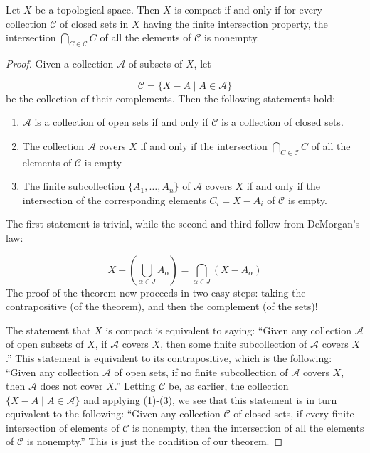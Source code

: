 \begin{theorem}
\label{thm:\thetheorem}
 Let \(X\) be a topological space. Then \(X\) is compact if and only if for every collection \(\mathcal{C}\) of closed sets in \(X\) having the finite intersection property, the intersection \(\mathop{\bigcap }\limits_{{C \in \mathcal{C}}}C\) of all the elements of \(\mathcal{C}\) is nonempty.
\end{theorem}
\begin{proof}
 Given a collection \(\mathcal{A}\) of subsets of \(X\), let

\[
\mathcal{C} = \{ X - A \mid A \in \mathcal{A}\}
\]
be the collection of their complements. Then the following statements hold:

\begin{enumerate}[itemsep=0.2em, parsep=0pt, topsep=0pt, partopsep=0pt, leftmargin=*, label=(\arabic*), align=left]
\item \(\mathcal{A}\) is a collection of open sets if and only if \(\mathcal{C}\) is a collection of closed sets.
\item The collection \(\mathcal{A}\) covers \(X\) if and only if the intersection \(\mathop{\bigcap }\limits_{{C \in \mathcal{C}}}C\) of all the elements of \(\mathcal{C}\) is empty
\item The finite subcollection \(\{ {A_{1},\ldots ,A_{n}}\}\) of \(\mathcal{A}\) covers \(X\) if and only if the intersection of the corresponding elements \(C_{i} = X - A_{i}\) of \(\mathcal{C}\) is empty.
\end{enumerate}

The first statement is trivial, while the second and third follow from DeMorgan's law:

\[
X - ( {\mathop{\bigcup }\limits_{{\alpha \in J}}A_{\alpha }}) = \mathop{\bigcap }\limits_{{\alpha \in J}}( {X - A_{\alpha }})
\]
The proof of the theorem now proceeds in two easy steps: taking the contrapositive (of the theorem), and then the complement (of the sets)!

The statement that \(X\) is compact is equivalent to saying: ``Given any collection \(\mathcal{A}\) of open subsets of \(X\), if \(\mathcal{A}\) covers \(X\), then some finite subcollection of \(\mathcal{A}\) covers \(X\).'' This statement is equivalent to its contrapositive, which is the following: ``Given any collection \(\mathcal{A}\) of open sets, if no finite subcollection of \(\mathcal{A}\) covers \(X\), then \(\mathcal{A}\) does not cover \(X\).'' Letting \(\mathcal{C}\) be, as earlier, the collection \(\{ X - A \mid A \in \mathcal{A}\}\) and applying (1)-(3), we see that this statement is in turn equivalent to the following: ``Given any collection \(\mathcal{C}\) of closed sets, if every finite intersection of elements of \(\mathcal{C}\) is nonempty, then the intersection of all the elements of \(\mathcal{C}\) is nonempty.'' This is just the condition of our theorem.


\end{proof}
